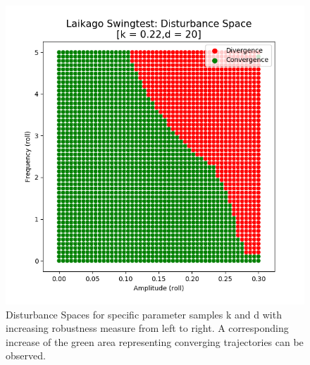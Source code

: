 \begin{figure}[h]
\begin{minipage}{0.33\textwidth}
        \end{minipage}
        \begin{minipage}{0.33\textwidth}
            \centering
            \includegraphics[width=\textwidth]{figures/swingtest_ds_opt_vfinal.png} %
        \end{minipage}

    \caption[Disturbance Spaces for Selected Parameter Sets, Drop Test]{Disturbance Spaces for specific parameter samples k and d with increasing robustness measure from left to right. A corresponding increase of the green area representing converging trajectories can be observed.}
    \label{fig:swingds}
    \end{figure}

